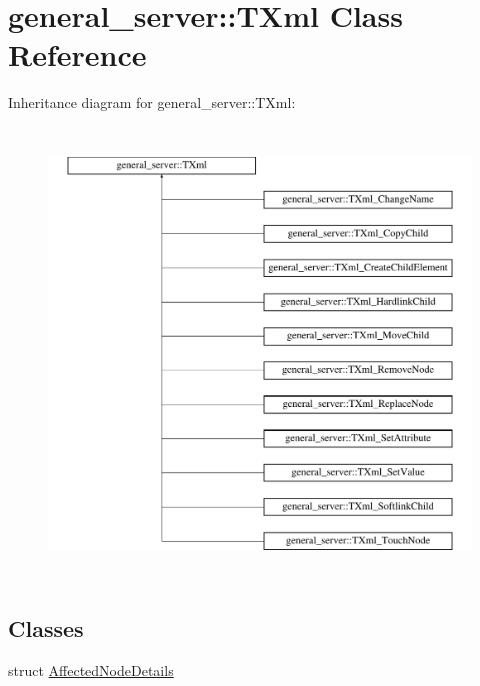 \hypertarget{classgeneral__server_1_1TXml}{\section{general\-\_\-server\-:\-:\-T\-Xml \-Class \-Reference}
\label{classgeneral__server_1_1TXml}
}
\-Inheritance diagram for general\-\_\-server\-:\-:\-T\-Xml\-:\begin{figure}[H]
\begin{center}
\leavevmode
\includegraphics[height=12.000000cm]{classgeneral__server_1_1TXml}
\end{center}
\end{figure}
\subsection*{\-Classes}
\begin{DoxyCompactItemize}
\item 
struct \hyperlink{structgeneral__server_1_1TXml_1_1AffectedNodeDetails}{\-Affected\-Node\-Details}
\end{DoxyCompactItemize}
